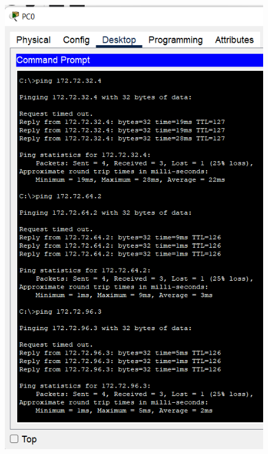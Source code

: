 \begin{enumerate}
\begin{enumerate}
\begin{figure}[H]
\begin{center}
\includegraphics[scale=.5]{../figures/p2/test-ping-1}

\end{center}
\end{figure}
\end{enumerate}
\end{enumerate}
